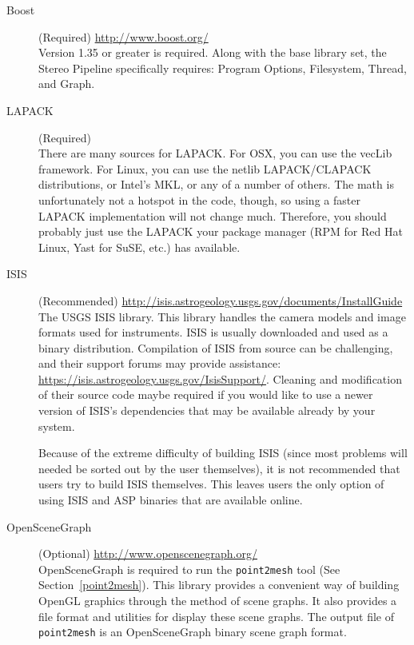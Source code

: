 \begin{description}
\item [{Boost}] (Required) \url{http://www.boost.org/}\\
Version 1.35 or greater is required. Along with the base library
set, the Stereo Pipeline specifically requires: Program Options, Filesystem,
Thread, and Graph.

\item [{LAPACK}] (Required)\\
There are many sources for LAPACK\@. For OSX, you can use the
vecLib framework. For Linux, you can use the netlib LAPACK/CLAPACK
distributions, or Intel's MKL, or any of a number of others. The math
is unfortunately not a hotspot in the code, though, so using a faster
LAPACK implementation will not change much. Therefore, you should
probably just use the LAPACK your package manager (RPM for Red Hat
Linux, Yast for SuSE, etc.) has available.

\item [{ISIS}] (Recommended) \url{http://isis.astrogeology.usgs.gov/documents/InstallGuide}\\

The \ac{USGS} \acf{ISIS} library. This library handles the camera
models and image formats used for instruments.  \ac{ISIS} is usually
downloaded and used as a binary distribution.  Compilation of
\ac{ISIS} from source can be challenging, and their support forums may
provide assistance:
\url{https://isis.astrogeology.usgs.gov/IsisSupport/}. Cleaning and
modification of their source code maybe required if you would like to
use a newer version of ISIS's dependencies that may be available already
by your system.

Because of the extreme difficulty of building ISIS (since most
problems will needed be sorted out by the user themselves), it is not
recommended that users try to build ISIS themselves. This leaves users
the only option of using ISIS and ASP binaries that are available
online.

\item [{OpenSceneGraph}] (Optional) \url{http://www.openscenegraph.org/}\\

OpenSceneGraph is required to run the \texttt{point2mesh} tool (See
Section~\ref{point2mesh}). This library provides a convenient way of
building OpenGL graphics through the method of scene graphs. It also
provides a file format and utilities for display these scene
graphs. The output file of \texttt{point2mesh} is an OpenSceneGraph
binary scene graph format.


\end{description}
